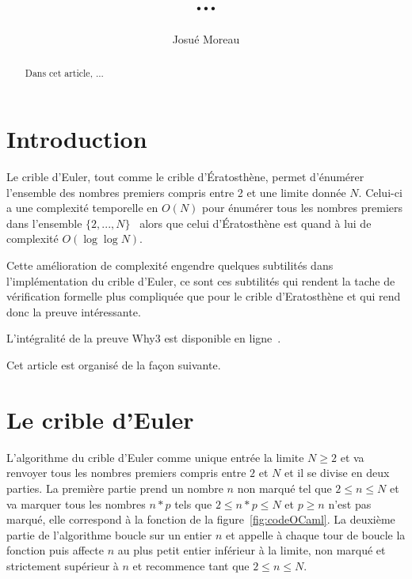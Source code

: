\documentclass[a4paper]{easychair}
\begin{document}
\title{...}
\author{Josué Moreau}
\maketitle

\begin{abstract}
  Dans cet article, ...
\end{abstract}

\section{Introduction}


Le crible d'Euler, tout comme le crible d'\'{E}ratosthène, permet d'énumérer
l'ensemble des nombres premiers compris entre 2 et une limite donnée $N$.
Celui-ci a une complexité temporelle en $O(N)$ pour énumérer tous les
nombres premiers dans l'ensemble $\{2,...,N\}$~\cite{crible-euler} alors que celui
d'\'{E}ratosthène est quand à lui de complexité $O(\log\log N)$.

Cette amélioration de complexité engendre quelques subtilités dans l'implémentation
du crible d'Euler, ce sont ces subtilités qui rendent la tache de vérification
formelle plus compliquée que pour le crible d'{E}ratosthène et qui rend donc la
preuve intéressante.






L'intégralité de la preuve Why3 est disponible en ligne~\cite{mapreuve}.

Cet article est organisé de la façon suivante.

\section{Le crible d'Euler}


L'algorithme du crible d'Euler comme unique entrée la limite $N \geq 2$ et va
renvoyer tous les nombres premiers compris entre $2$ et $N$ et il se divise en
deux parties. La première partie prend un nombre $n$ non marqué
tel que $2 \leq n \leq N$ et va marquer tous les nombres $n * p$ tels que
$2 \leq n * p \leq N$ et $p \geq n$ n'est pas marqué, elle correspond à la fonction
 de la figure~\ref{fig:codeOCaml}.
La deuxième partie de l'algorithme boucle sur un entier $n$ et appelle à chaque
tour de boucle la fonction  puis affecte $n$ au plus
petit entier inférieur à la limite, non marqué et strictement supérieur à $n$
et recommence tant que $2 \leq n \leq N$.
\end{document}
